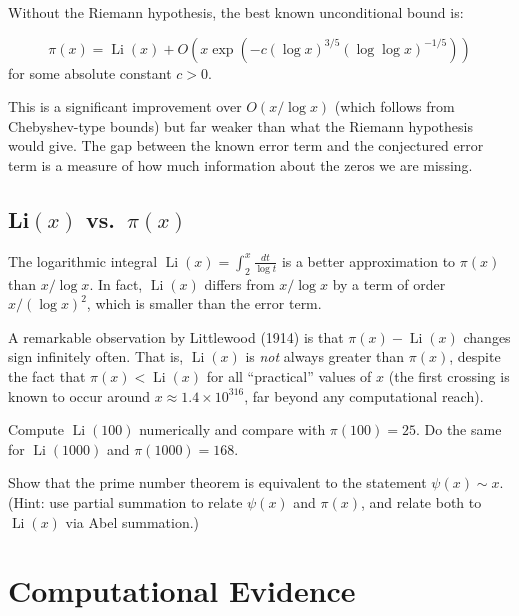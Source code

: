 Without the Riemann hypothesis, the best known unconditional bound is:

\begin{theorem}
\[
\pi(x) = \operatorname{Li}(x) + O\left(x \exp\left(-c (\log x)^{3/5} (\log\log x)^{-1/5}\right)\right)
\]
for some absolute constant $c > 0$.
\end{theorem}

This is a significant improvement over $O(x / \log x)$ (which follows from Chebyshev-type bounds) but far weaker than what the Riemann hypothesis would give. The gap between the known error term and the conjectured error term is a measure of how much information about the zeros we are missing.

\subsection{Li$(x)$ vs.\ $\pi(x)$}

The logarithmic integral $\operatorname{Li}(x) = \int_2^x \frac{dt}{\log t}$ is a better approximation to $\pi(x)$ than $x / \log x$. In fact, $\operatorname{Li}(x)$ differs from $x / \log x$ by a term of order $x / (\log x)^2$, which is smaller than the error term.

A remarkable observation by Littlewood (1914) is that $\pi(x) - \operatorname{Li}(x)$ changes sign infinitely often. That is, $\operatorname{Li}(x)$ is \emph{not} always greater than $\pi(x)$, despite the fact that $\pi(x) < \operatorname{Li}(x)$ for all ``practical'' values of $x$ (the first crossing is known to occur around $x \approx 1.4 \times 10^{316}$, far beyond any computational reach).

\begin{exercise}
\label{ex:lilog}
Compute $\operatorname{Li}(100)$ numerically and compare with $\pi(100) = 25$. Do the same for $\operatorname{Li}(1000)$ and $\pi(1000) = 168$.
\end{exercise}

\begin{exercise}
\label{ex:pnt_error}
Show that the prime number theorem is equivalent to the statement $\psi(x) \sim x$. (Hint: use partial summation to relate $\psi(x)$ and $\pi(x)$, and relate both to $\operatorname{Li}(x)$ via Abel summation.)
\end{exercise}

\section{Computational Evidence}
\label{sec:computational}

